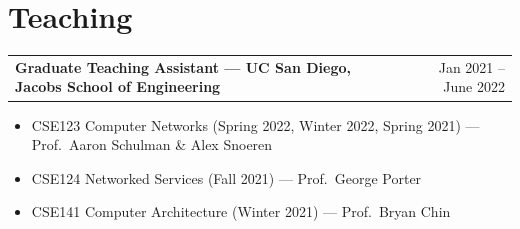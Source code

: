\documentclass[a4paper,10pt]{article}
\begin{document}
\section{Teaching}

\vspace{3pt}
\begin{tabularx}{\textwidth}{@{}X r@{}}
  \textbf{Graduate Teaching Assistant — UC San Diego, Jacobs School of Engineering} & Jan 2021 – June 2022
\end{tabularx}
\vspace{1pt}
\begin{itemize}[leftmargin=1.4em, itemsep=0pt, topsep=2pt, parsep=0pt, label={$\circ$}]
  \item \small CSE123 Computer Networks \textcolor{lighttext}{(Spring 2022, Winter 2022, Spring 2021)} — Prof.\ Aaron Schulman \& Alex Snoeren
  \item \small CSE124 Networked Services \textcolor{lighttext}{(Fall 2021)} — Prof.\ George Porter
  \item \small CSE141 Computer Architecture \textcolor{lighttext}{(Winter 2021)} — Prof.\ Bryan Chin
\end{itemize}
\end{document}
